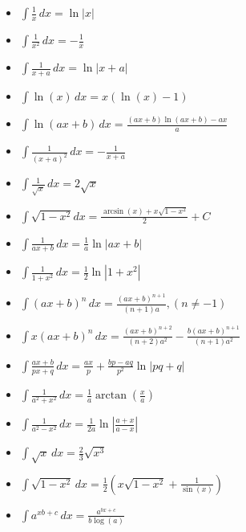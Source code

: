 \documentclass[25pt]{sciposter}
\begin{document}
\begin{multicols}{3}
\begin{itemize}
	\item $\int \frac{1}{x} \,dx = \ln |x|$
	\item $\int \frac{1}{x^2} \,dx = -\frac{1}{x}$
	\item $\int \frac{1}{x+a} \,dx = \ln |x+a|$
	\item $\int \ln(x) \,dx = x(\ln(x) - 1)$
	\item $\int \ln(ax + b) \,dx = \frac{(a x+b) \ln (a x+b)-a x}{a}$
	\item $\int \frac{1}{(x+a)^2} \,dx = - \frac{1}{x+a}$
	\item $\int \frac{1}{\sqrt{x}} \,dx = 2 \sqrt{x}$
	\item $\int \sqrt{1-x^2} dx = \frac{\arcsin(x) + x \sqrt{1-x^2}}{2} + C$
	\item $\int \frac{1}{ax+b} \,dx = \frac{1}{a} \ln |ax+b|$
	\item $\int \frac{1}{1 + x^2} \,dx = \frac{1}{2} \ln |1 + x^2|$
	\item $\int(ax + b)^n \,dx = \frac{(ax + b)^{n+1}}{(n + 1)a}, (n \neq -1)$
	\item $\int x(ax+b)^n \,dx = \frac{(ax + b)^{n+2}}{(n+2)a^2} -
	\frac{b(ax+b)^{n+1}}{(n+1)a^2}$
	\item $\int \frac{ax + b}{px + q} \,dx = \frac{ax}{p} + \frac{bp - aq}{p^2} \ln
	|pq+q|$
	\item $\int \frac{1}{a^2 + x^2} \,dx = \frac{1}{a} \arctan(\frac{x}{a})$
	\item $\int \frac{1}{a^2 - x^2} \,dx = \frac{1}{2a} \ln \left | \frac{a+x}{a-x}
	\right |$
	\item $\int \sqrt{x} \,dx = \frac{2}{3}\sqrt{x^3}$
	\item $\int \sqrt{1-x^2} \,dx = \frac{1}{2}\left( x\sqrt{1-x^2}+\frac{1}{\sin(x)} \right)$
	\item $\int a^{xb + c} \,dx = \frac{a^{bx + c}}{b \log(a)}$
\end{itemize}


\end{multicols}
\end{document}
